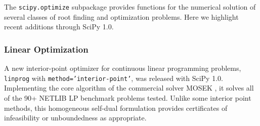 \newcommand{\RR}{\ensuremath{\mathbb{R}}}
The \texttt{scipy.optimize} subpackage provides functions for the numerical
solution of several classes of root finding and optimization problems.
Here we highlight recent additions through SciPy 1.0.



\subsubsection*{Linear Optimization}

A new interior-point optimizer for continuous linear programming problems, \texttt{linprog} with \texttt{method='interior-point'}, was released with SciPy 1.0. Implementing the core algorithm of the commercial solver MOSEK \cite{andersen2000mosek}, it solves all of the 90+ NETLIB LP benchmark problems \cite{netlib} tested. Unlike some interior point methods, this homogeneous self-dual formulation provides certificates of infeasibility or unboundedness as appropriate. 

